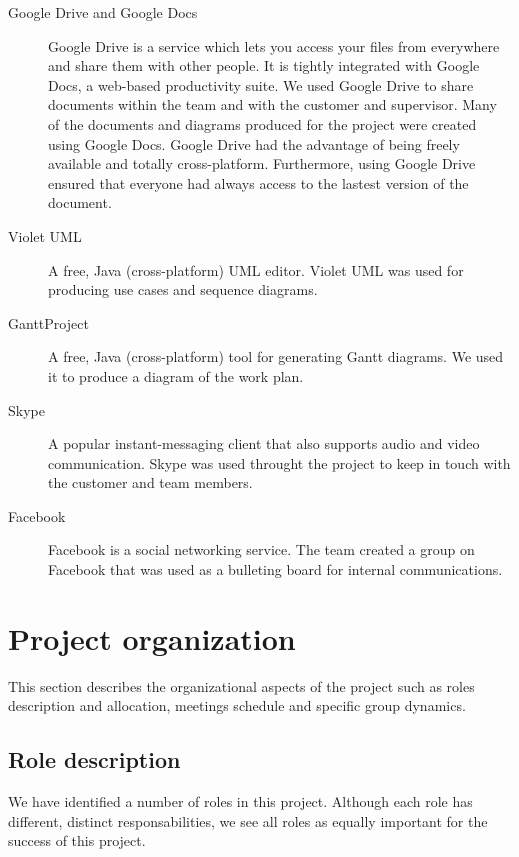 \begin{description}
\item[Google Drive and Google Docs]
Google Drive is a service which lets you access your files from everywhere and share them with other people.
It is tightly integrated with Google Docs, a web-based productivity suite. We used Google Drive to share documents
within the team and with the customer and supervisor.
Many of the documents and diagrams produced for the project were created using Google Docs.
Google Drive had the advantage of being freely available and totally cross-platform. Furthermore,
using Google Drive ensured that everyone had always access to the lastest version of the document.

\item[Violet UML]
A free, Java (cross-platform) UML editor. Violet UML was used for producing use cases and sequence diagrams.

\item[GanttProject]
A free, Java (cross-platform) tool for generating Gantt diagrams. We used it to produce a diagram of the work plan.

\item[Skype]
A popular instant-messaging client that also supports audio and video communication.
Skype was used throught the project to keep in touch with the customer and team members.

\item[Facebook]
Facebook is a social networking service. The team created a group on Facebook that was used as a bulleting board for internal communications.


\end{description}



\section{Project organization}
\label{section:organization}

This section describes the organizational aspects of the project such as roles description and allocation,
meetings schedule and
specific group dynamics.

\subsection{Role description}
We have identified a number of roles in this project. Although each role has different, distinct responsabilities,
we see all roles as equally important for the success of this project.

